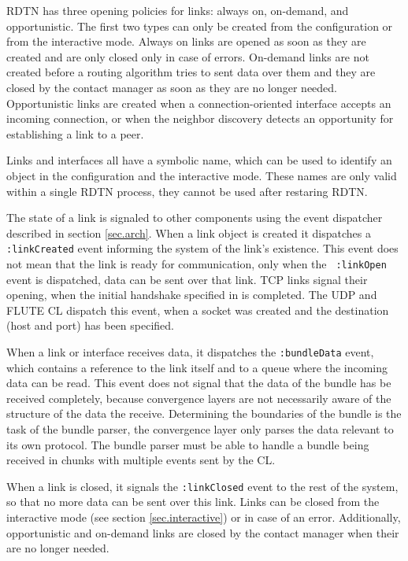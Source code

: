 \documentclass{article}
\begin{document}
RDTN has three opening policies for links: always on, on-demand, and
opportunistic. The first two types can only be created from the
configuration or from the interactive mode. Always on links are opened as soon
as they are created and are only closed only in case of errors. On-demand links
are not created before a routing algorithm tries to sent data over them and they
are closed by the contact manager as soon as they are no longer needed.
Opportunistic links are created when a connection-oriented interface accepts an
incoming connection, or when the neighbor discovery detects an opportunity for
establishing a link to a peer.

Links and interfaces all have a symbolic name, which can be used to identify an
object in the configuration and the interactive mode. These names are only valid
within a single RDTN process, they cannot be used after restaring RDTN.

The state of a link is signaled to other components using the event dispatcher
described in section \ref{sec.arch}. When a link object is created it dispatches
a {\tt :linkCreated} event informing the system of the link's existence. This
event does not mean that the link is ready for communication, only when the {\tt
:linkOpen} event is dispatched, data can be sent over that link. TCP links
signal their opening, when the initial handshake specified in \cite{tcp-cl} is
completed. The UDP and FLUTE CL dispatch this event, when a socket was created
and the destination (host and port) has been specified.

When a link or interface receives data, it dispatches the {\tt :bundleData}
event, which contains a reference to the link itself and to a queue where the
incoming data can be read. This event does not signal that the data of the
bundle has be received completely, because convergence layers are not
necessarily aware of the structure of the data the receive. Determining the
boundaries of the bundle is the task of the bundle parser, the convergence layer
only parses the data relevant to its own protocol. The bundle parser must be
able to handle a bundle being received in chunks with multiple events sent by
the CL.

When a link is closed, it signals the {\tt :linkClosed} event to the rest of the
system, so that no more data can be sent over this link. Links can be closed
from the interactive mode (see section \ref{sec.interactive}) or in case of an
error. Additionally, opportunistic and on-demand links are closed by the contact
manager when their are no longer needed.
\end{document}
